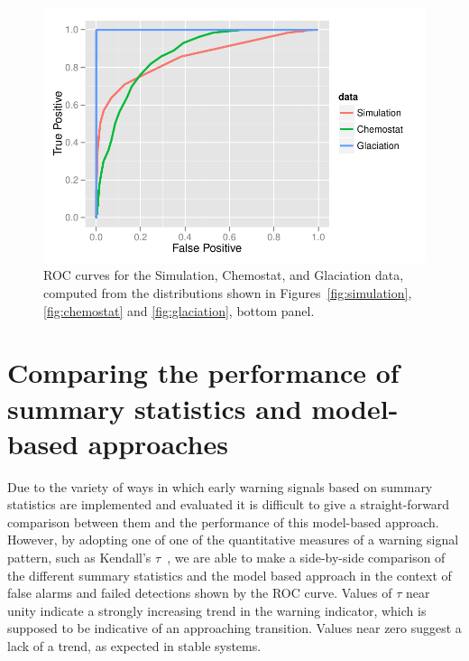 \documentclass[authoryear,review,11pt]{elsarticle}
\begin{document}
 \begin{figure}
   \begin{center}
     \includegraphics[width=\linewidth]{figures/rocplot.pdf}
     \caption{ROC curves for the Simulation, Chemostat, and Glaciation data, computed from the distributions shown in Figures~\ref{fig:simulation}, \ref{fig:chemostat} and \ref{fig:glaciation}, bottom panel.}
     \label{fig:rocdata}
  \end{center}
 \end{figure}


\section{Comparing the performance of summary statistics and model-based approaches}
Due to the variety of ways in which early warning signals based on summary statistics are implemented and evaluated
it is difficult to give a straight-forward comparison between them and the performance of this model-based approach.
However, by adopting one of one of the quantitative measures of a warning signal pattern,
such as Kendall's $\tau$~\citep{Dakos2008, Dakos2011, Dakos2009},
we are able to make a side-by-side comparison of the different summary statistics and the model based approach in the
context of false alarms and failed detections shown by the ROC curve.
Values of $\tau$ near unity indicate a strongly increasing trend in the warning indicator,
which is supposed to be indicative of an approaching transition.
Values near zero suggest a lack of a trend, as expected in stable systems.
\end{document}
